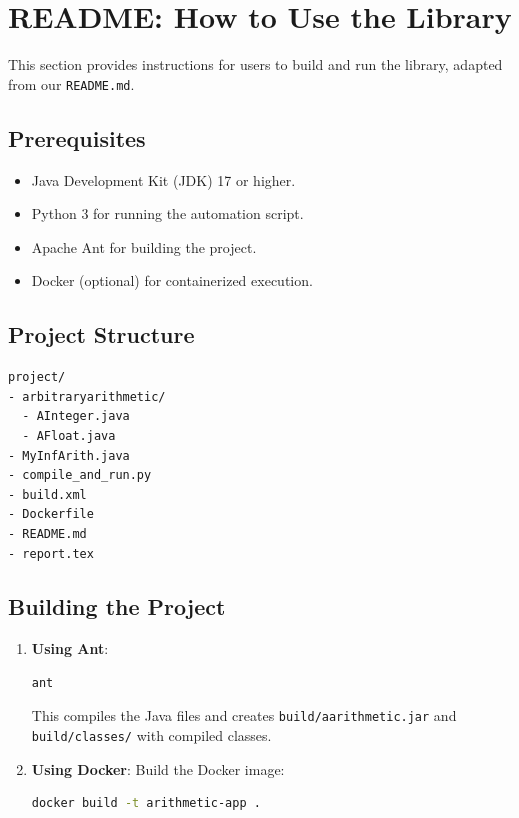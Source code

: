 \documentclass[a4paper,12pt]{article}
\begin{document}
\section{README: How to Use the Library}
This section provides instructions for users to build and run the library, adapted from our \texttt{README.md}.

\subsection{Prerequisites}
\begin{itemize}
    \item Java Development Kit (JDK) 17 or higher.
    \item Python 3 for running the automation script.
    \item Apache Ant for building the project.
    \item Docker (optional) for containerized execution.
\end{itemize}

\subsection{Project Structure}
\begin{lstlisting}[language=bash]
project/
- arbitraryarithmetic/
  - AInteger.java
  - AFloat.java
- MyInfArith.java
- compile_and_run.py
- build.xml
- Dockerfile
- README.md
- report.tex
\end{lstlisting}

\subsection{Building the Project}
\begin{enumerate}
    \item \textbf{Using Ant}:
    \begin{lstlisting}[language=bash]
ant
    \end{lstlisting}
    This compiles the Java files and creates \texttt{build/aarithmetic.jar} and \texttt{build/classes/} with compiled classes.

    \item \textbf{Using Docker}:
    Build the Docker image:
    \begin{lstlisting}[language=bash]
docker build -t arithmetic-app .
    \end{lstlisting}
\end{enumerate}
\end{document}
